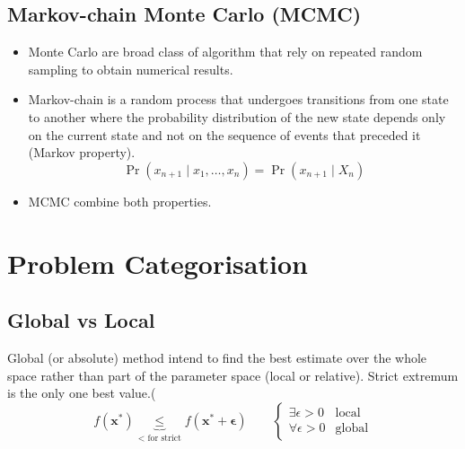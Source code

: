 \documentclass[twocolumn]{article}
\numberwithin{equation}{section}
\begin{document}
	\subsection{Markov-chain Monte Carlo (MCMC)}
\begin{itemize}
	\item Monte Carlo are broad class of algorithm that rely on repeated random sampling to obtain numerical results.
	\item Markov-chain is a random process that undergoes transitions from one state to another where the probability distribution of the new state depends only on the current state and not on the sequence of events that preceded it (Markov property).
$$\Pr(x_{n+1}\mid x_1, \ldots, x_n) = \Pr(x_{n+1}\mid X_n)$$ 
	\item MCMC combine both properties.
\end{itemize}













\newpage
\section{Problem Categorisation}
	\subsection{Global vs Local}
Global (or absolute) method intend to find the best estimate over the whole space rather than part of the parameter space (local or relative). Strict extremum is the only one best value.(
$$f(\mathbf{x}^*) \underbrace{\leq}_{< \mbox{ for strict}} f(\mathbf{x^*+\epsilon}) \qquad  \left\{
  \begin{array}{lr}
    \exists \epsilon>0 & \mbox{local}\\
    \forall \epsilon>0 & \mbox{global}
  \end{array}
\right.
 $$
\end{document}
